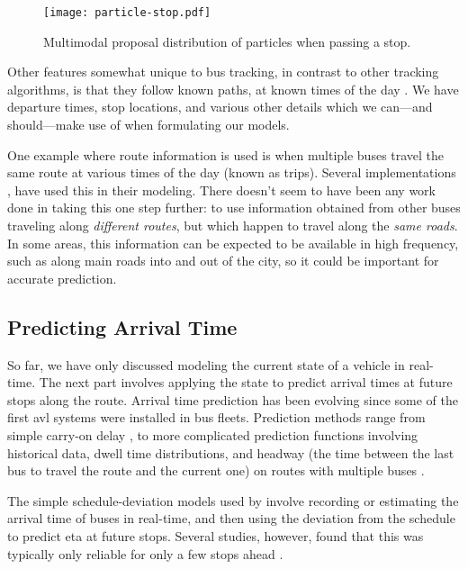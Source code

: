 \documentclass[12pt,a4paper]{article}
\begin{document}
\begin{figure}[bt]
  \centering
  \texttt{[image: particle-stop.pdf]}
  \caption{Multimodal proposal distribution of particles when passing a stop.}
  \label{fig:particle-stop}
\end{figure}

Other features somewhat unique to bus tracking, 
in contrast to other tracking algorithms,
is that they follow known paths, at known times of the day \citep{cathey-dailey:2003}.
We have departure times, stop locations, 
and various other details which we can---and should---make use of 
when formulating our models.


One example where route information is used is when multiple buses travel the same 
route at various times of the day (known as trips).
Several implementations \citep{yu-etal:2011,hans-etal:2015},
have used this in their modeling.
There doesn't seem to have been any work done in taking this one step further:
to use information obtained from other buses traveling along \emph{different routes},
but which happen to travel along the \emph{same roads}.
In some areas, this information can be expected to be available in high frequency,
such as along main roads into and out of the city,
so it could be important for accurate prediction.



\subsection{Predicting Arrival Time}
\label{sec:arrivaltimeprediction}

So far, we have only discussed modeling the current state of a vehicle in real-time.
The next part involves applying the state to predict arrival times at future stops along the route.
Arrival time prediction has been evolving since some of the first \gls{avl}
systems were installed in bus fleets.
Prediction methods range from simple carry-on delay \citep{cn},
to more complicated prediction functions involving historical data,
dwell time distributions, 
and headway (the time between the last bus to travel the route and the current one)
on routes with multiple buses 
\citep{cn}.


The simple schedule-deviation models used by \cite{dailey:2001} involve
recording or estimating the arrival time of buses in real-time,
and then using the deviation from the schedule to predict \gls{eta}
at future stops.
Several studies, however, found that this was typically only reliable for only a few stops ahead
\citep{cn}.
\end{document}
